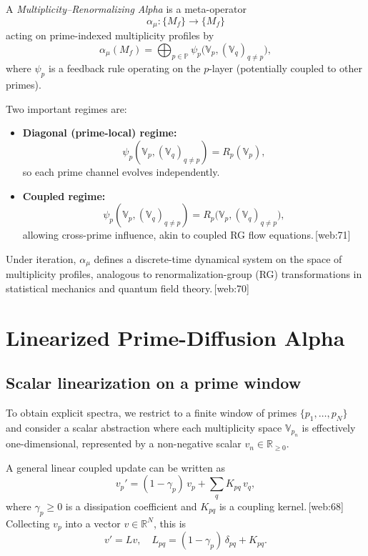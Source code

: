 \documentclass[11pt]{article}
\begin{document}
\begin{definition}
A \emph{Multiplicity--Renormalizing Alpha} is a meta-operator
\[
\alpha_\mu : \{M_f\} \to \{M_f\}
\]
acting on prime-indexed multiplicity profiles by
\[
\alpha_\mu(M_f) = \bigoplus_{p \in \mathbb{P}} \psi_p\big(\mathbb{V}_p, (\mathbb{V}_q)_{q \neq p}\big),
\]
where \(\psi_p\) is a feedback rule operating on the \(p\)-layer (potentially coupled to other primes).
\end{definition}

\noindent Two important regimes are:
\begin{itemize}
  \item \textbf{Diagonal (prime-local) regime:}
  \[
  \psi_p(\mathbb{V}_p, (\mathbb{V}_q)_{q \neq p}) = R_p(\mathbb{V}_p),
  \]
  so each prime channel evolves independently.
  \item \textbf{Coupled regime:}
  \[
  \psi_p(\mathbb{V}_p, (\mathbb{V}_q)_{q \neq p}) = R_p\big(\mathbb{V}_p, (\mathbb{V}_q)_{q \neq p}\big),
  \]
  allowing cross-prime influence, akin to coupled RG flow equations.\,[web:71]
\end{itemize}

Under iteration, \(\alpha_\mu\) defines a discrete-time dynamical system on the space of multiplicity profiles, analogous to renormalization-group (RG) transformations in statistical mechanics and quantum field theory.\,[web:70]

\section{Linearized Prime-Diffusion Alpha}

\subsection{Scalar linearization on a prime window}

To obtain explicit spectra, we restrict to a finite window of primes \(\{p_1, \dots, p_N\}\) and consider a scalar abstraction where each multiplicity space \(\mathbb{V}_{p_n}\) is effectively one-dimensional, represented by a non-negative scalar \(v_n \in \mathbb{R}_{\ge 0}\).

A general linear coupled update can be written as
\begin{equation}
v_p' = (1 - \gamma_p)\, v_p + \sum_{q} K_{pq}\, v_q,
\end{equation}
where \(\gamma_p \ge 0\) is a dissipation coefficient and \(K_{pq}\) is a coupling kernel.\,[web:68] Collecting \(v_p\) into a vector \(v \in \mathbb{R}^N\), this is
\begin{equation}
v' = L v,\quad L_{pq} = (1 - \gamma_p)\, \delta_{pq} + K_{pq}.
\end{equation}
\end{document}
